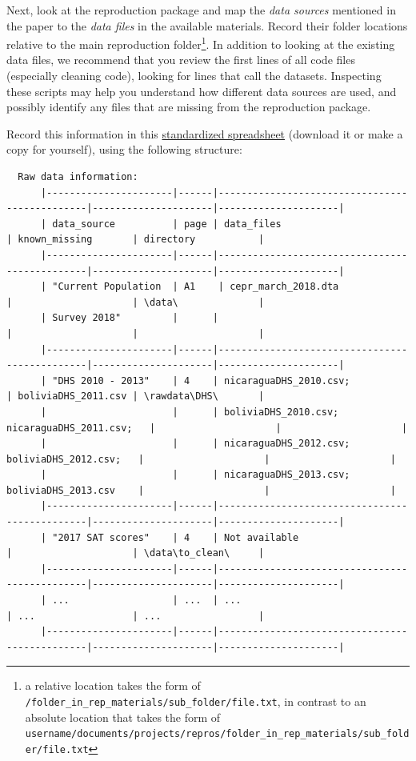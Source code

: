 \documentclass[]{book}
\begin{document}
Next, look at the reproduction package and map the \emph{data sources} mentioned in the paper to the \emph{data files} in the available materials. Record their folder locations relative to the main reproduction folder\footnote{a relative location takes the form of \texttt{/folder\_in\_rep\_materials/sub\_folder/file.txt}, in contrast to an absolute location that takes the form of \texttt{username/documents/projects/repros/folder\_in\_rep\_materials/sub\_folder/file.txt}}. In addition to looking at the existing data files, we recommend that you review the first lines of all code files (especially cleaning code), looking for lines that call the datasets. Inspecting these scripts may help you understand how different data sources are used, and possibly identify any files that are missing from the reproduction package.

Record this information in this \href{https://docs.google.com/spreadsheets/d/1LUIdVFH0OfR70C7z07TYeE-uWzKI_JIeWUMaYhqEKK0/edit\#gid=0\&range=A1}{standardized spreadsheet} (download it or make a copy for yourself), using the following structure:

\begin{verbatim}
  Raw data information:
      |----------------------|------|-----------------------------------------------|---------------------|---------------------|
      | data_source          | page | data_files                                    | known_missing       | directory           |
      |----------------------|------|-----------------------------------------------|---------------------|---------------------|
      | "Current Population  | A1    | cepr_march_2018.dta                          |                     | \data\              |
      | Survey 2018"         |      |                                               |                     |                     |
      |----------------------|------|-----------------------------------------------|---------------------|---------------------|
      | "DHS 2010 - 2013"    | 4    | nicaraguaDHS_2010.csv;                        | boliviaDHS_2011.csv | \rawdata\DHS\       |
      |                      |      | boliviaDHS_2010.csv; nicaraguaDHS_2011.csv;   |                     |                     |
      |                      |      | nicaraguaDHS_2012.csv; boliviaDHS_2012.csv;   |                     |                     |
      |                      |      | nicaraguaDHS_2013.csv; boliviaDHS_2013.csv    |                     |                     |
      |----------------------|------|-----------------------------------------------|---------------------|---------------------|
      | "2017 SAT scores"    | 4    | Not available                                 |                     | \data\to_clean\     |
      |----------------------|------|-----------------------------------------------|---------------------|---------------------|
      | ...                  | ...  | ...                                           | ...                 | ...                 |
      |----------------------|------|-----------------------------------------------|---------------------|---------------------|
\end{verbatim}
\end{document}
